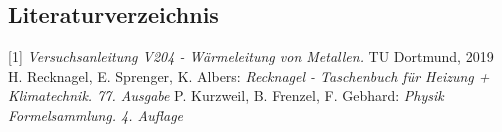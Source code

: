 \documentclass[titlepage = firstcover]{scrartcl}
\begin{document}
  \subsection{Literaturverzeichnis}
        [1] \textit{Versuchsanleitung V204 - Wärmeleitung von Metallen.} TU Dortmund, 2019 \newline
        [2] H. Recknagel, E. Sprenger, K. Albers: \textit{Recknagel - Taschenbuch für Heizung + Klimatechnik. 77. Ausgabe} \newline
        [3] P. Kurzweil, B. Frenzel, F. Gebhard: \textit{Physik Formelsammlung. 4. Auflage}

    
\end{document}

